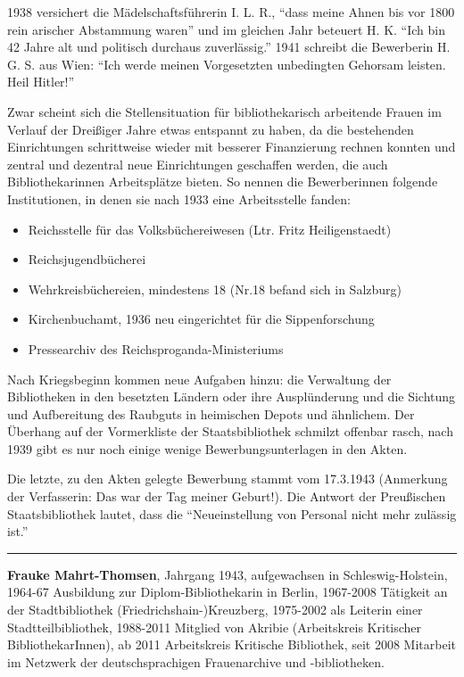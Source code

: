\documentclass[a4paper,
fontsize=11pt,
oneside,
numbers=noperiodatend,
parskip=half-,
bibliography=totoc,
final
]{scrartcl}
\begin{document}
1938 versichert die Mädelschaftsführerin I. L. R., \enquote{dass meine
Ahnen bis vor 1800 rein arischer Abstammung waren} und im gleichen Jahr
beteuert H. K. \enquote{Ich bin 42 Jahre alt und politisch durchaus
zuverlässig.} 1941 schreibt die Bewerberin H. G. S. aus Wien:
\enquote{Ich werde meinen Vorgesetzten unbedingten Gehorsam leisten.
Heil Hitler!}

Zwar scheint sich die Stellensituation für bibliothekarisch arbeitende
Frauen im Verlauf der Dreißiger Jahre etwas entspannt zu haben, da die
bestehenden Einrichtungen schrittweise wieder mit besserer Finanzierung
rechnen konnten und zentral und dezentral neue Einrichtungen geschaffen
werden, die auch Bibliothekarinnen Arbeitsplätze bieten. So nennen die
Bewerberinnen folgende Institutionen, in denen sie nach 1933 eine
Arbeitsstelle fanden:

\begin{itemize}
\item
  Reichsstelle für das Volksbüchereiwesen (Ltr. Fritz Heiligenstaedt)
\item
  Reichsjugendbücherei
\item
  Wehrkreisbüchereien, mindestens 18 (Nr.18 befand sich in Salzburg)
\item
  Kirchenbuchamt, 1936 neu eingerichtet für die Sippenforschung
\item
  Pressearchiv des Reichsproganda-Ministeriums
\end{itemize}

Nach Kriegsbeginn kommen neue Aufgaben hinzu: die Verwaltung der
Bibliotheken in den besetzten Ländern oder ihre Ausplünderung und die
Sichtung und Aufbereitung des Raubguts in heimischen Depots und
ähnlichem. Der Überhang auf der Vormerkliste der Staatsbibliothek
schmilzt offenbar rasch, nach 1939 gibt es nur noch einige wenige
Bewerbungsunterlagen in den Akten.

Die letzte, zu den Akten gelegte Bewerbung stammt vom 17.3.1943
(Anmerkung der Verfasserin: Das war der Tag meiner Geburt!). Die Antwort
der Preußischen Staatsbibliothek lautet, dass die
\enquote{Neueinstellung von Personal nicht mehr zulässig ist.}

\begin{center}\rule{3in}{0.4pt}\end{center}

\textbf{Frauke Mahrt-Thomsen}, Jahrgang 1943, aufgewachsen in
Schleswig-Holstein, 1964-67 Ausbildung zur Diplom-Bibliothekarin in
Berlin, 1967-2008 Tätigkeit an der Stadtbibliothek
(Friedrichs\-hain-)Kreuzberg, 1975-2002 als Leiterin einer
Stadtteilbibliothek, 1988-2011 Mitglied von Akribie (Arbeitskreis
Kritischer BibliothekarInnen), ab 2011 Arbeitskreis Kritische
Bibliothek, seit 2008 Mitarbeit im Netzwerk der deutschsprachigen
Frauenarchive und -bibliotheken.

\end{document}
